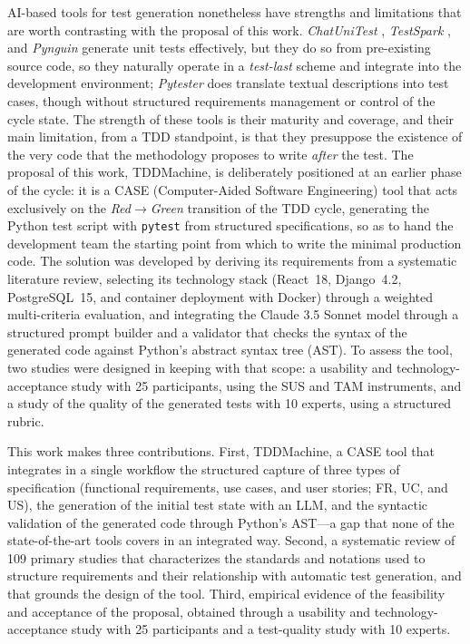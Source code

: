 \documentclass[10pt,journal,twoside,letterpaper]{IEEEtran}
\begin{document}
    AI-based tools for test generation nonetheless have strengths and limitations that are worth contrasting with the proposal of this work. \emph{ChatUniTest} \cite{chen2024chatunitest}, \emph{TestSpark} \cite{sapozhnikov2024testspark}, and \emph{Pynguin} \cite{lukasczyk2022pynguin} generate unit tests effectively, but they do so from pre-existing source code, so they naturally operate in a \emph{test-last} scheme and integrate into the development environment; \emph{Pytester} \cite{takerngsaksiri2025pytester} does translate textual descriptions into test cases, though without structured requirements management or control of the cycle state. The strength of these tools is their maturity and coverage, and their main limitation, from a TDD standpoint, is that they presuppose the existence of the very code that the methodology proposes to write \emph{after} the test. The proposal of this work, TDDMachine, is deliberately positioned at an earlier phase of the cycle: it is a CASE (Computer-Aided Software Engineering) tool that acts exclusively on the \emph{Red}$\rightarrow$\emph{Green} transition of the TDD cycle, generating the Python test script with \texttt{pytest} from structured specifications, so as to hand the development team the starting point from which to write the minimal production code. The solution was developed by deriving its requirements from a systematic literature review, selecting its technology stack (React~18, Django~4.2, PostgreSQL~15, and container deployment with Docker) through a weighted multi-criteria evaluation, and integrating the Claude 3.5 Sonnet model through a structured prompt builder and a validator that checks the syntax of the generated code against Python's abstract syntax tree (AST). To assess the tool, two studies were designed in keeping with that scope: a usability and technology-acceptance study with 25 participants, using the SUS and TAM instruments, and a study of the quality of the generated tests with 10 experts, using a structured rubric.
    
    This work makes three contributions. First, TDDMachine, a CASE tool that integrates in a single workflow the structured capture of three types of specification (functional requirements, use cases, and user stories; FR, UC, and US), the generation of the initial test state with an LLM, and the syntactic validation of the generated code through Python's AST---a gap that none of the state-of-the-art tools covers in an integrated way. Second, a systematic review of 109 primary studies that characterizes the standards and notations used to structure requirements and their relationship with automatic test generation, and that grounds the design of the tool. Third, empirical evidence of the feasibility and acceptance of the proposal, obtained through a usability and technology-acceptance study with 25 participants and a test-quality study with 10 experts.
    
\end{document}
